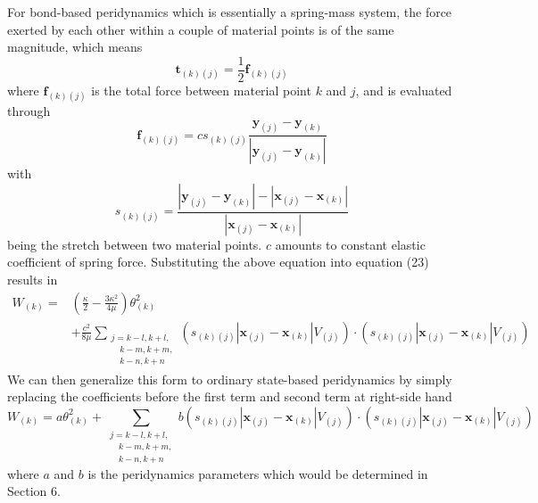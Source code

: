 \documentclass[a4paper,11pt,CJK]{paper}
\newcommand{\bfxj}{\textbf{x}_{(j)}}
\newcommand{\bfyj}{\textbf{y}_{(j)}}
\newcommand{\bfxk}{\textbf{x}_{(k)}}
\newcommand{\bfyk}{\textbf{y}_{(k)}}
\newcommand{\skj}{s_{(k)(j)}}
\newcommand{\fkj}{\textbf{f}_{(k)(j)}}
\newcommand{\tkj}{\textbf{t}_{(k)(j)}}
\newcommand{\thetak}{\theta_{(k)}}
\begin{document}
For bond-based peridynamics which is essentially a spring-mass system, the force exerted by each other within a couple of material points is of the same magnitude, which means
\begin{equation}
\tkj =  \frac{1}{2}\fkj
\end{equation}
where $\fkj$ is the total force between material point $k$ and $j$, and is evaluated through
\begin{equation}
\fkj = c\skj\frac{\bfyj - \bfyk}{|\bfyj - \bfyk|}
\end{equation}
with
\begin{equation}
\skj = \frac{|\bfyj - \bfyk| - |\bfxj - \bfxk|}{|\bfxj - \bfxk|}
\end{equation}
being the stretch between two material points. $c$ amounts to constant elastic coefficient of spring force. Substituting the above equation into equation (23) results in
\begin{equation}
\begin{aligned}
W_{(k)} =& (\frac{\kappa}{2} -\frac{3\kappa^2}{4\mu})\thetak^2 \\
         &+\frac{c^2}{8\mu}\sum_{\substack {j=k-l,k+l,\\ \quad k-m,k+m,\\ \quad k-n,k+n}}(\skj|\bfxj-\bfxk|V_{(j)})\cdot(\skj|\bfxj-\bfxk|V_{(j)})
\end{aligned}
\end{equation}
We can then generalize this form to ordinary state-based peridynamics by simply replacing the coefficients before the first term and second term at right-side hand
\begin{equation}
W_{(k)} = a\thetak^2
          +\sum_{\substack {j=k-l,k+l,\\ \quad k-m,k+m,\\ \quad k-n,k+n}}b(\skj|\bfxj-\bfxk|V_{(j)})\cdot(\skj|\bfxj-\bfxk|V_{(j)})
\end{equation}
where $a$ and $b$ is the peridynamics parameters which would be determined in Section 6.
\end{document}
